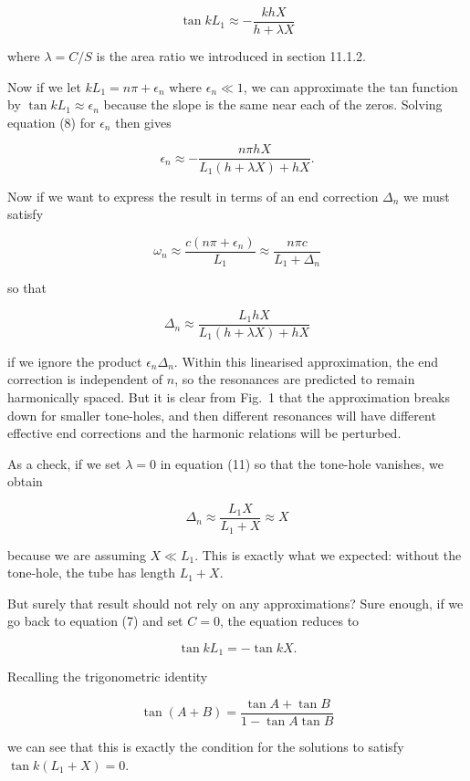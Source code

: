   $$\tan kL_1 \approx -\dfrac{khX}{h+ \lambda X} \tag{8}$$ 

  where $\lambda = C/S$ is the area ratio we introduced in section 11.1.2. 

  Now if we let $kL_1=n\pi + \epsilon_n$ where $\epsilon_n \ll 1$, we can 
  approximate the tan function by $\tan kL_1 \approx \epsilon_n$ because the 
  slope is the same near each of the zeros. Solving equation (8) for 
  $\epsilon_n$ then gives 

  $$\epsilon_n \approx -\dfrac{n \pi h X}{L_1(h+\lambda X) +hX}. \tag{9}$$ 

  Now if we want to express the result in terms of an end correction $\Delta_n$ 
  we must satisfy 

  $$\omega_n \approx \frac{c(n \pi +\epsilon_n)}{L_1} \approx \dfrac{n \pi 
  c}{L_1 + \Delta_n} \tag{10}$$ 

  so that 

  $$\Delta_n \approx \dfrac{L_1 h X}{L_1(h+ \lambda X) +hX} \tag{11}$$ 

  if we ignore the product $\epsilon_n \Delta_n$. Within this linearised 
  approximation, the end correction is independent of $n$, so the resonances 
  are predicted to remain harmonically spaced. But it is clear from Fig.\ 1 
  that the approximation breaks down for smaller tone-holes, and then different 
  resonances will have different effective end corrections and the harmonic 
  relations will be perturbed. 

  As a check, if we set $\lambda = 0$ in equation (11) so that the tone-hole 
  vanishes, we obtain 

  $$\Delta_n \approx \dfrac{L_1 X}{L_1 + X} \approx X \tag{12}$$ 

  because we are assuming $X \ll L_1$. This is exactly what we expected: 
  without the tone-hole, the tube has length $L_1+X$. 

  But surely that result should not rely on any approximations? Sure enough, if 
  we go back to equation (7) and set $C=0$, the equation reduces to 

  $$\tan k L_1 =-\tan kX . \tag{13}$$ 

  Recalling the trigonometric identity 

  $$\tan(A+B)=\dfrac{\tan A + \tan B}{1-\tan A \tan B} \tag{14}$$ 

  we can see that this is exactly the condition for the solutions to satisfy 
  $\tan k(L_1+X)=0$. 